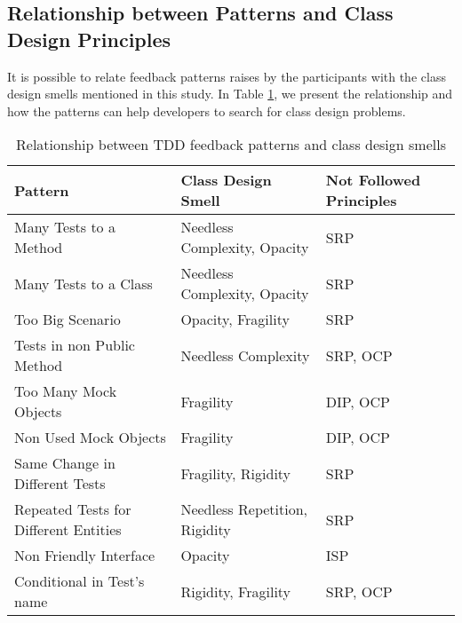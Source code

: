 \documentclass[conference]{IEEEtran}
\begin{document}
\begin{framed}
\begin{framed}
\subsection{Relationship between Patterns and Class Design Principles}

It is possible to relate feedback patterns raises by the participants with the class design
smells mentioned in this study.
In Table \ref{tab:relacao-padroes}, we present the relationship and how the patterns
can help developers to search for class design problems.

\begin{table}[h!]
	\centering
	\begin{tabular}{| p{2.5cm} | p{2.5cm} | p{2cm} | }
		\hline

		\textbf{Pattern} & \textbf{Class Design Smell} & \textbf{Not Followed Principles}\\
		
		\hline

		Many Tests to a Method                   & Needless Complexity, Opacity   & SRP \\ \hline
		Many Tests to a Class                  & Needless Complexity, Opacity   & SRP \\ \hline
		Too Big Scenario                           & Opacity, Fragility                  & SRP \\ \hline
		Tests in non Public Method             & Needless Complexity              & SRP, OCP \\ \hline
		Too Many Mock Objects                       & Fragility                             & DIP, OCP \\ \hline
		Non Used Mock Objects                  & Fragility                             & DIP, OCP \\ \hline
		Same Change in Different Tests           & Fragility, Rigidity                    & SRP \\ \hline
		Repeated Tests for Different Entities     & Needless Repetition, Rigidity        & SRP  \\ \hline
		Non Friendly Interface                         & Opacity                               & ISP \\ \hline
		Conditional in Test's name                   & Rigidity, Fragility                    & SRP, OCP \\

		\hline
		
	\end{tabular}
	\caption{Relationship between TDD feedback patterns and class design smells}
	\label{tab:relacao-padroes}
\end{table}


\end{framed}
\end{framed}
\end{document}

